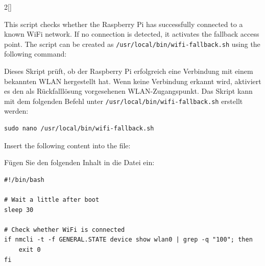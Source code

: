 \begin{paracol}{2}[]
\renewcommand{\deutschertitel}{Schritt 2: Skript für die Rückfalllösung erstellen}
\renewcommand{\englischertitel}{Step 2: Create a Fallback Script}
\makrounterunterabschnitt

This script checks whether the Raspberry Pi has successfully connected to a known WiFi network. If no connection is detected, it activates the fallback access point. The script can be created as \verb!/usr/local/bin/wifi-fallback.sh! using the following command:

\colger

Dieses Skript prüft, ob der Raspberry Pi erfolgreich eine Verbindung mit einem bekannten WLAN hergestellt hat. Wenn keine Verbindung erkannt wird, aktiviert es den als Rückfalllösung vorgesehenen WLAN-Zugangspunkt. Das Skript kann mit dem folgenden Befehl unter \verb!/usr/local/bin/wifi-fallback.sh! erstellt werden:

\colende


\begin{lstlisting}[style=shell]
sudo nano /usr/local/bin/wifi-fallback.sh
\end{lstlisting}

\colstart

Insert the following content into the file:

\colger

Fügen Sie den folgenden Inhalt in die Datei ein:

\colende


\begin{lstlisting}[style=shell]
#!/bin/bash

# Wait a little after boot
sleep 30

# Check whether WiFi is connected
if nmcli -t -f GENERAL.STATE device show wlan0 | grep -q "100"; then
    exit 0
fi


\end{lstlisting}
\end{paracol}
